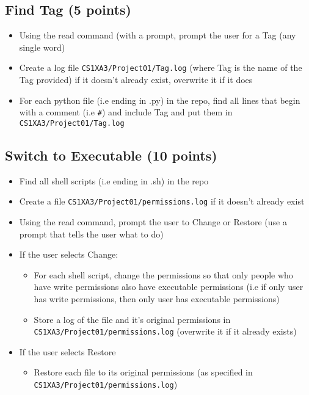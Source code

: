 \documentclass[11pt]{article}
\begin{document}
\subsection{Find Tag (5 points)}
\label{sec:org22c0153}
\begin{itemize}
\item Using the read command (with a prompt, prompt the user for a Tag (any
single word)
\item Create a log file \texttt{CS1XA3/Project01/Tag.log} (where Tag is the name of the
Tag provided) if it doesn't already exist, overwrite it if it does
\item For each python file (i.e ending in {\color{purple}.py}) in the repo, find all lines
that begin with a comment (i.e \texttt{\#}) and include Tag and put them in \texttt{CS1XA3/Project01/Tag.log}
\end{itemize}
\subsection{Switch to Executable (10 points)}
\label{sec:orgdb0ed05}
\begin{itemize}
\item Find all shell scripts (i.e ending in {\color{purple}.sh}) in the repo
\item Create a file \texttt{CS1XA3/Project01/permissions.log} if it doesn't already exist
\item Using the read command, prompt the user to {\color{purple}Change} or
{\color{purple}Restore} (use a prompt that tells the user what to do)
\item If the user selects {\color{purple}Change}:
\begin{itemize}
\item For each shell script, change the permissions so that only people who
have write permissions also have executable permissions (i.e if only
user has write permissions, then only user has executable permissions)
\item Store a log of the file and it's original permissions in
\texttt{CS1XA3/Project01/permissions.log} (overwrite it if it already exists)
\end{itemize}
\item If the user selects {\color{purple}Restore}
\begin{itemize}
\item Restore each file to its original permissions (as specified in
\texttt{CS1XA3/Project01/permissions.log})
\end{itemize}
\end{itemize}
\end{document}
